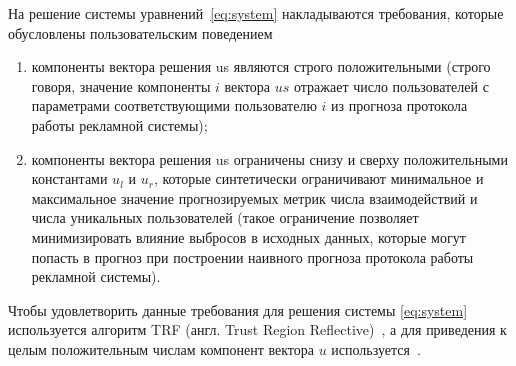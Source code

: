 На решение системы уравнений~\eqref{eq:system} накладываются требования, которые обусловлены пользовательским
поведением
\begin{enumerate}
    \item компоненты вектора решения us являются строго положительными (строго говоря, значение компоненты 
    $i$ вектора $us$ отражает число пользователей с параметрами соответствующими пользователю $i$ из
    прогноза протокола работы рекламной системы);
    \item компоненты вектора решения us ограничены снизу и сверху положительными константами $u_l$ и 
    $u_r$, которые синтетически ограничивают минимальное и максимальное значение прогнозируемых
    метрик числа взаимодействий и числа уникальных пользователей (такое ограничение позволяет минимизировать
    влияние выбросов в исходных данных, которые могут попасть в прогноз при построении наивного прогноза
    протокола работы рекламной системы).
\end{enumerate}

Чтобы удовлетворить данные требования для решения системы \eqref{eq:system} используется алгоритм TRF 
(англ. Trust Region Reflective)~\autocite{algo:trf}, а для приведения к целым положительным числам компонент
вектора $u$ используется~\autocite{algo:rr}.
